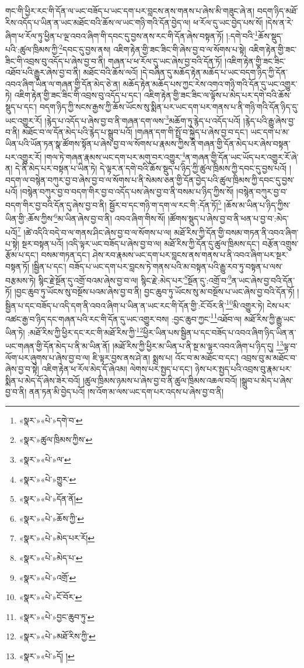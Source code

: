 གང་གི་ཕྱིར་རང་གི་དོན་ལ་ཡང་བཟོད་པ་ཡང་དག་པར་བླངས་ནས་གནས་པ་ཞེས་མི་གཟུང་ཞེ་ན། བདག་ཉིད་མཐོ་རིས་འདོད་པ་ཡིན་ན་ཡང་མཐོང་བའི་ཆོས་ལ་ཡང་གཉི་གའི་དོན་བྱེད་ལ། ཕ་རོལ་དུ་ཡང་བྱེད་པས་སོ། །དེས་ན་རེ་ཞིག་ཕ་རོལ་ཏུ་ཕྱིན་པ་ལྔ་འབའ་ཞིག་གི་དབང་དུ་བྱས་ནས་རང་གི་དོན་ཞེས་བསྟན་ཏོ། །:དགེ་བའི་\footnote{«སྣར་»«པེ་»དགེ་བ་}ཆོས་སྡུད་པའི་:ཚུལ་ཁྲིམས་ཀྱི་\footnote{«སྣར་»ཚུལ་ཁྲིམས་ཀྱིས་}དབང་དུ་བྱས་ནས། འཇིག་རྟེན་གྱི་ཟང་ཟིང་གི་ཞེས་བྱ་བ་ལ་སོགས་པ་སྟེ། འཇིག་རྟེན་གྱི་ཟང་ཟིང་གི་འབྲས་བུ་འདོད་པ་ཞེས་བྱ་བ་ནི། གཞན་པ་ཕ་རོལ་དུ་ཡང་ཞེས་བྱ་བའི་དོན་ཏོ། །འཇིག་རྟེན་གྱི་ཟང་ཟིང་འཐོབ་པའི་རྒྱུར་ཞེས་བྱ་བ་ནི། མཐོང་བའི་ཆོས་ལའོ། །དེ་བཞིན་དུ་མཆོད་རྟེན་མཆོད་པ་ཡང་བདག་ཉིད་ཀྱི་དོན་འབའ་ཞིག་ཡིན་ལ་གཞན་གྱི་དོན་མེད་ཅེ་ན། མཆོད་རྟེན་མཆོད་པས་ཀྱང་རེས་འགའ་གཉི་གའི་དོན་དུ་ཡང་འགྱུར་ཏེ། འཇིག་རྟེན་གྱི་ཟང་ཟིང་གི་འབྲས་བུ་འདོད་པ་དང་། འཇིག་རྟེན་གྱི་ཟང་ཟིང་ལ་ལྟོས་པ་མེད་པར་དགེ་བའི་ཆོས་སྡུད་པ་དང་། བདག་ཉིད་ཀྱི་སངས་རྒྱས་ཀྱི་ཆོས་ཡོངས་སུ་སྨིན་པར་ཡང་དག་པར་གནས་པ་ནི་གཉི་གའི་དོན་ཉིད་དུ་ཡང་འགྱུར་རོ། །རྙེད་པ་འདོད་པ་ཞེས་བྱ་བ་ནི་གཞན་དག་ལས་\footnote{«སྣར་»«པེ་»ལ་}མཆོག་ཏུ་རྙེད་པ་འདོད་པའོ། །རྙེད་པའི་རྒྱུ་ཞེས་བྱ་བ་ནི། མཐོང་བ་ལ་དོན་མེད་པའི་རྙེད་པ་སྒྲུབ་པའོ། །གཞན་དག་གི་སྤྲོ་བ་སྐྱེད་པ་ཞེས་བྱ་བ་དང་། ཡང་དག་པ་མ་ཡིན་པའི་ཡོན་ཏན་སྣ་ཚོགས་སྟོན་པ་ཞེས་བྱ་བ་ལ་སོགས་པ་རྣམས་ཀྱིས་ནི་གཞན་གྱི་དོན་མེད་པར་ཞེས་བསྟན་པར་འགྱུར་རོ། །གལ་ཏེ་གཞན་རྣམས་ཡང་དག་པར་མགུ་བར་འགྱུར་\footnote{«སྣར་»«པེ་»གྱུར་}ན་གཞན་གྱི་དོན་ཡང་ཡོད་པར་འགྱུར་རོ་ཞེ་ན། དེ་ནི་མེད་པར་བསྟན་པ་ཡིན་ཏེ། དེ་ལྟར་ན་དགེ་བའི་ཆོས་སྡུད་པ་ཉིད་ཀྱི་ཚུལ་ཁྲིམས་ཀྱི་དབང་དུ་བྱས་པའོ། །བདག་ལ་བསྙེན་བཀུར་བྱ་བ་ཞེས་བྱ་བ་ལ་སོགས་པ་ནི་སེམས་ཅན་གྱི་དོན་བྱེད་པའི་ཚུལ་ཁྲིམས་ཀྱི་དབང་དུ་བྱས་པའོ། །བསྙེན་བཀུར་བྱ་བ་བདག་གིར་བྱ་བ་འདོད་པས་ཞེས་བྱ་བ་ནི་བསམ་པ་ཉིད་ཀྱིས་སོ། །བསྙེན་བཀུར་བྱ་བ་བདག་གིར་བྱ་བའི་དོན་དུ་ཞེས་བྱ་བ་ནི། སྦྱོར་བ་དང་གཉི་ག་དག་ལ་རང་གི་:དོན་ཏོ།\footnote{«སྣར་»«པེ་»དོན་ནོ།} །ཆོས་མ་ཡིན་པ་ཉིད་ཀྱིས་ཡིན་གྱི་:ཆོས་ཀྱིས་\footnote{«སྣར་»«པེ་»ཆོས་ཀྱི་}མ་ཡིན་ཞེས་བྱ་བ་ནི། འབའ་ཞིག་གིས་སོ། །ཚོགས་སྡུད་པ་ཞེས་བྱ་བ་ནི་ཕན་པ་བྱ་བ་:མེད་པའོ།\footnote{«སྣར་»«པེ་»མེད་པར་རོ།} །ཚེ་འདིའི་བདེ་བ་ལ་གནས་ཤིང་ཞེས་བྱ་བ་ལ་སོགས་པ་ལ། མཐོ་རིས་ཀྱི་དོན་གྱི་བསམ་གཏན་ནི་འབའ་ཞིག་པ་སྟེ། སྔར་བསྟན་པའོ། །འདི་ལྟར་ཡང་བཟོད་པ་ཞེས་བྱ་བ་ལ། མཐོ་རིས་ཀྱི་དོན་དུ་ཚུལ་ཁྲིམས་དང་། བརྩོན་འགྲུས་རྩོམ་པ་དང་། བསམ་གཏན་དང་། ཤེས་རབ་རྣམས་ཡང་དག་པར་བླངས་ནས་གནས་པ་ནི་འབའ་ཞིག་པར་སྔར་བསྟན་ཏོ། །སྦྱིན་པ་དང་། བཟོད་པ་ཡང་དག་པར་བླངས་ཏེ་གནས་པའི་མ་བསྟན་པའི་རྒྱུ་རབ་ཏུ་བསྟན་པ་ལས་བརྩམས་ཏེ། སྙིང་རྗེ་སྔོན་དུ་འགྲོ་བའམ་ཞེས་བྱ་བ་ལ། སྙིང་རྗེ་:མེད་པར་\footnote{«སྣར་»«པེ་»མེད་པ་}སྔོན་དུ་:འགྲོ་བ་\footnote{«སྣར་»«པེ་»འགྲོ་}ན་ཡང་ཞེས་བྱ་བའི་དོན་ཏོ། །བྱང་ཆུབ་ཏུ་ཡོངས་སུ་བསྔོས་པའམ་ཞེས་བྱ་བ་ནི། བྱང་ཆུབ་ཏུ་ཡོངས་སུ་མ་བསྔོས་པ་ཡང་ཞེས་བྱ་བའི་དོན་ཏོ། །སྦྱིན་པ་དང་བཟོད་པ་འདི་དག་ནི་འབའ་ཞིག་པ་ཡིན་ན་ཡང་རང་གི་དོན་གྱི་:ངོ་བོར་ནི་\footnote{«སྣར་»«པེ་»ངོ་བོར་}མི་འགྱུར་ཏེ། ངེས་པར་འཚང་རྒྱ་བ་ཉིད་དང་གཞན་པའི་རང་གི་དོན་དུ་ཡང་འགྱུར་བས། :བྱང་ཆུབ་ཀྱང་\footnote{«སྣར་»«པེ་»བྱང་ཆུབ་ཏུ་}འཐོབ་ལ། མཐོ་རིས་ཀྱི་རྒྱུ་ཡང་ཡིན་ཏེ། :མཐོ་རིས་ཀྱི་ཕྱིར་དང་རང་གི་མཐོ་རིས་ཀྱི་\footnote{«སྣར་»«པེ་»མཐོ་རིས་ཀྱི་}ཕྱིར་ཡིན་པས་སྦྱིན་པ་དང་བཟོད་པ་འབའ་ཞིག་ཉིད་ཡིན་ན་ཡང་གཞན་གྱི་དོན་མེད་པ་ནི་མ་ཡིན་ནོ། །མཐོ་རིས་ཀྱི་ཕྱིར་མ་ཡིན་པ་ནི་སྔ་མ་ལྟར་འབའ་ཞིག་པ་ཉིད་དུ། \footnote{«སྣར་»«པེ་»དོ། ། }ལྟ་བ་ལོག་པར་ཞུགས་པ་ཞེས་བྱ་བ་ལ། ཇི་ལྟར་བྱས་ནས་ཤེ་ན། སྨྲས་པ། འོང་བ་མ་མཐོང་བ་དང་། འབྲས་བུ་མ་མཐོང་བ་ཞེས་བྱ་བ་སྟེ། འཇིག་རྟེན་ཕ་རོལ་མེད་དོ་ཞེའམ། ལེགས་པར་སྤྱད་པ་དང་། ཉེས་པར་སྤྱད་པའི་འབྲས་བུ་རྣམ་པར་སྨིན་པ་མེད་དོ་ཞེས་ཟེར་བའོ། །ཚུལ་ཁྲིམས་ཉམས་པ་ཞེས་བྱ་བ་ནི་ཚུལ་ཁྲིམས་འཆལ་བའོ། །སྒྲུབ་པ་མེད་པ་ཞེས་བྱ་བ་ནི། ནན་ཏན་མི་བྱེད་པའོ། །ས་འོག་མ་ལས་ཡང་དག་པར་འདས་པ་ཞེས་བྱ་བ་ནི། 